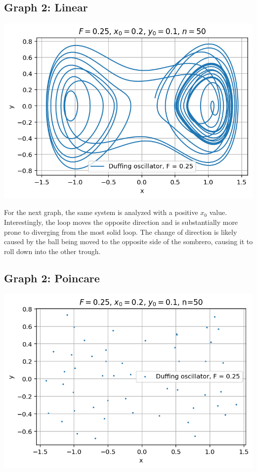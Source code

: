 \documentclass[aps,pra,notitlepage,amsmath,amssymb,letterpaper,12pt]{revtex4-1}
\begin{document}
\subsection{Graph 2: Linear}

\includegraphics{graph2.png}

For the next graph, the same system is analyzed with a positive $x_0$ value.  Interestingly, the loop moves the opposite direction and is substantially more prone to diverging from the most solid loop.  The change of direction is likely caused by the ball being moved to the opposite side of the sombrero, causing it to roll down into the other trough.

\subsection{Graph 2: Poincare}

\includegraphics{poincare2.png}
\end{document}
